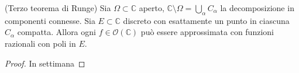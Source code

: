 \begin{thm}
  (Terzo teorema di Runge) Sia $\Omega \subset \mathbb{C}$ aperto, $\displaystyle \mathbb{C}\setminus \Omega=\bigcup_{\alpha}C_{\alpha}$ la decomposizione in componenti connesse. Sia $E \subset \mathbb{C}$ discreto con esattamente un punto in ciascuna $C_{\alpha}$ compatta. Allora ogni $f \in \mathcal{O}(\mathbb{C})$ può essere approssimata con funzioni razionali con poli in $E$.
\end{thm}

\begin{proof}
  In settimana
\end{proof}
